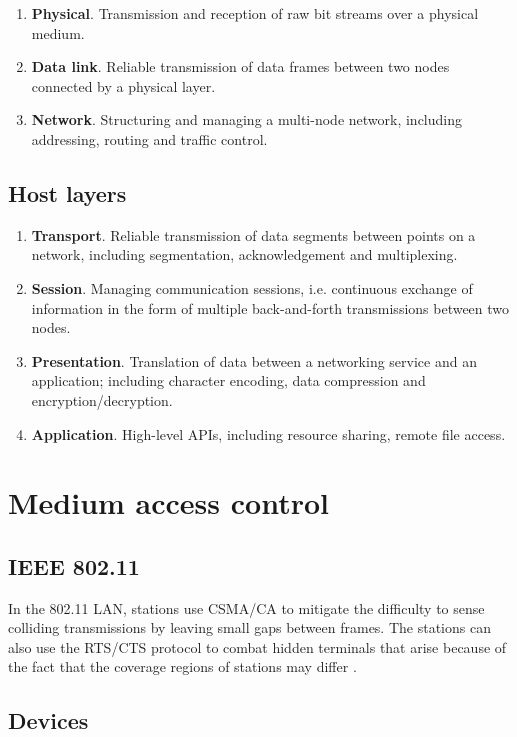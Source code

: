 \documentclass[12pt, oneside]{book}
\begin{document}
\begin{enumerate}
\item \textbf{Physical}. Transmission and reception of raw bit streams over a physical medium.
\item \textbf{Data link}. Reliable transmission of data frames between two nodes connected by a physical layer.
\item \textbf{Network}. Structuring and managing a multi-node network, including addressing, routing and traffic control.
\end{enumerate}

\subsection{Host layers}

\begin{enumerate}
\item \textbf{Transport}. Reliable transmission of data segments between points on a network, including segmentation, acknowledgement and multiplexing.
\item \textbf{Session}. Managing communication sessions, i.e. continuous exchange of information in the form of multiple back-and-forth transmissions between two nodes.
\item \textbf{Presentation}. Translation of data between a networking service and an application; including character encoding, data compression and encryption/decryption.
\item \textbf{Application}. High-level APIs, including resource sharing, remote file access.
\end{enumerate}

\section{Medium access control}

\subsection{IEEE 802.11}

In the 802.11 LAN, stations use CSMA/CA to mitigate the difficulty to sense colliding transmissions by leaving small gaps between frames. The stations can also use the RTS/CTS protocol to combat hidden terminals that arise because of the fact that the coverage regions of stations may differ  \cite[p.~349]{computer-networks-tanenbaum-2012}.

\subsection{Devices}
\end{document}
